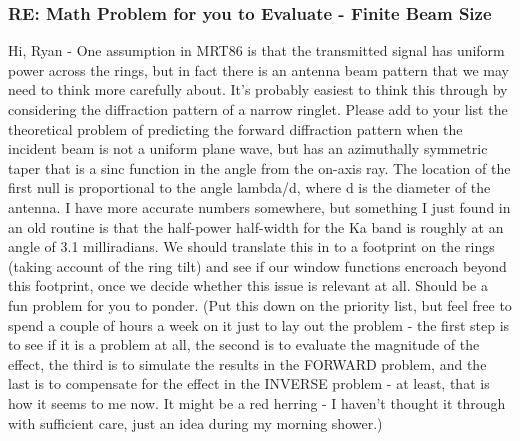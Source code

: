 \documentclass[crop=false,class=article,oneside]{standalone}
\begin{document}
\subsubsection{\footnotesize RE: Math Problem for you to Evaluate - Finite Beam Size}
Hi, Ryan - One assumption in MRT86 is that the transmitted signal has uniform power across the rings, but in fact there is an antenna beam pattern that we may need to think more carefully about. It's probably easiest to think this through by considering the diffraction pattern of a narrow ringlet. Please add to your list the theoretical problem of predicting the forward diffraction pattern when the incident beam is not a uniform plane wave, but has an azimuthally symmetric taper that is a sinc function in the angle from the on-axis ray. The location of the first null is proportional to the angle lambda/d, where d is the diameter of the antenna. I have more accurate numbers somewhere, but something I just found in an old routine is that the half-power half-width for the Ka band is roughly at an angle of 3.1 milliradians. We should translate this in to a footprint on the rings (taking account of the ring tilt) and see if our window functions encroach beyond this footprint, once we decide whether this issue is relevant at all. Should be a fun problem for you to ponder.
(Put this down on the priority list, but feel free to spend a couple of hours a week on it just to lay out the problem - the first step is to see if it is a problem at all, the second is to evaluate the magnitude of the effect, the third is to simulate the results in the FORWARD problem, and the last is to compensate for the effect in the INVERSE problem - at least, that is how it seems to me now. It might be a red herring - I haven't thought it through with sufficient care, just an idea during my morning shower.)
\end{document}
